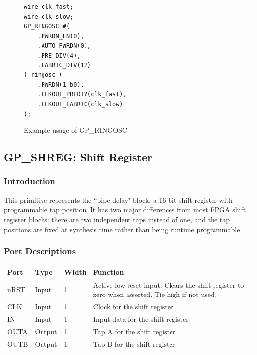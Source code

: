 \documentclass{article}
\begin{document}
\begin{figure}[h]
\begin{lstlisting}
wire clk_fast;
wire clk_slow;
GP_RINGOSC #(
	.PWRDN_EN(0),
	.AUTO_PWRDN(0),
	.PRE_DIV(4),
	.FABRIC_DIV(12)
) ringosc (
	.PWRDN(1'b0),
	.CLKOUT_PREDIV(clk_fast),
	.CLKOUT_FABRIC(clk_slow)
);
\end{lstlisting}
\caption{Example usage of GP\_RINGOSC}
\label{gp-ringosc-example}
\end{figure}


\pagebreak
\clearpage
\subsection{GP\_SHREG: Shift Register}

\subsubsection{Introduction}

This primitive represents the ``pipe delay" block, a 16-bit shift register with programmable tap position. It has two 
major differences from most FPGA shift register blocks: there are two independent taps instead of one, and the tap 
positions are fixed at synthesis time rather than being runtime programmable.

\subsubsection{Port Descriptions}

\begin{tabularx}{5in}{|l|l|l|X|}
\hline
{\bfseries Port} & {\bfseries Type} & {\bfseries Width} & {\bfseries Function} \\
\hline
nRST & Input & 1 & Active-low reset input. Clears the shift register to zero when asserted. Tie high if not used.\\
\hline
CLK & Input & 1 & Clock for the shift register\\
\hline
IN & Input & 1 & Input data for the shift register\\
\hline
OUTA & Output & 1 & Tap A for the shift register\\
\hline
OUTB & Output & 1 & Tap B for the shift register\\
\hline
\end{tabularx}
\end{document}
